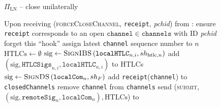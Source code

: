   \begin{figure}[H]
    \begin{protocolbox}{$\Pi_{\mathrm{LN}}$ -- close unilaterally}
      \begin{algorithmic}[1]
        \State Upon receiving (\textsc{forceCloseChannel}, \texttt{receipt},
        \textit{pchid}) from \environment:
        \Indent
          \State ensure \texttt{receipt} corresponds to an open
          $\mathtt{channel} \in \mathtt{channels}$ with ID \textit{pchid}
          \label{alg:protocol:close:unilateral:ensure}
            \State forget this ``hook''
          \EndIf
          \State assign latest \texttt{channel} sequence number to $n$
          \State $\mathrm{HTLCs} \gets \emptyset$
            \State $\mathrm{sig} \gets
            \textsc{SignIBS}\left(\mathtt{localHTLC}_{n, i}, sh_{\mathrm{htlc},
            n}\right)$
            \State add $\left(\mathrm{sig}, \mathtt{HTLCSigs}_{n, i},
            \mathtt{localHTLC}_{n, i}\right)$ to HTLCs
          \EndFor
          \State $\mathrm{sig} \gets \textsc{SignDS}\left(\mathtt{localCom}_n,
          sh_F\right)$
          \State add \texttt{receipt}(\texttt{channel}) to
          \texttt{closedChannels}
          \label{alg:protocol:close:unilateral:report}
          \State remove \texttt{channel} from \texttt{channels}
          \label{alg:protocol:close:unilateral:remove}
          \State send (\textsc{submit}, $\left(\mathrm{sig},
          \mathtt{remoteSig}_n, \mathtt{localCom}_n\right), \mathrm{HTLCs}$) to
          \ledger
          \label{alg:protocol:close:unilateral:submit}
        \EndIndent
      \end{algorithmic}
    \end{protocolbox}
    \caption{}
    \label{alg:protocol:close:unilateral}
  \end{figure}


